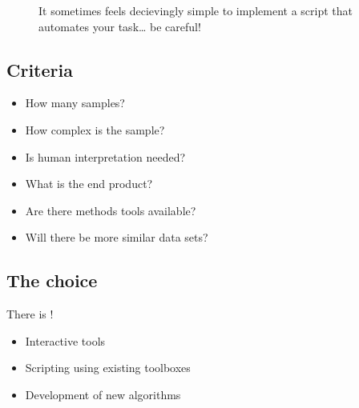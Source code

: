 \documentclass[letterpaper,10pt,english]{sphinxmanual}
\begin{document}
\begin{figure}[htbp]
\centering
\capstart

\noindent{}
\caption{It sometimes feels decievingly simple to implement a script that automates your task… be careful!}\label{\detokenize{01-Introduction:id24}}\end{figure}




\subsection{Criteria}
\label{\detokenize{01-Introduction:id5}}\begin{itemize}
\item {} 
\sphinxAtStartPar
How many samples?

\item {} 
\sphinxAtStartPar
How complex is the sample?

\item {} 
\sphinxAtStartPar
Is human interpretation needed?

\item {} 
\sphinxAtStartPar
What is the end product?

\item {} 
\sphinxAtStartPar
Are there methods tools available?

\item {} 
\sphinxAtStartPar
Will there be more similar data sets?

\end{itemize}


\subsection{The choice}
\label{\detokenize{01-Introduction:id6}}
\sphinxAtStartPar
There is !
\begin{itemize}
\item {} 
\sphinxAtStartPar
Interactive tools

\item {} 
\sphinxAtStartPar
Scripting using existing toolboxes

\item {} 
\sphinxAtStartPar
Development of new algorithms

\end{itemize}
\end{document}
